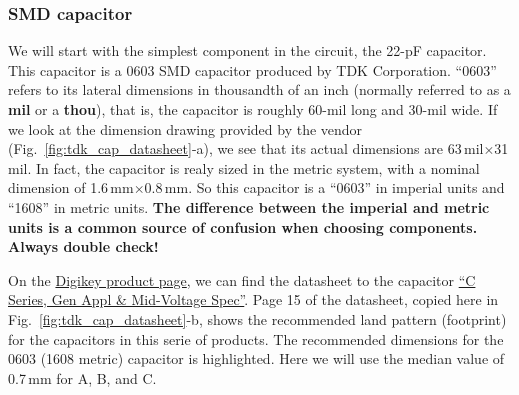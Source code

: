 \documentclass[12pt,letterpaper]{scrartcl}
\begin{document}
\subsubsection{SMD capacitor}
\label{sec:smd_cap_footprint}

We will start with the simplest component in the circuit, the 22-pF capacitor. This capacitor is a 0603 SMD capacitor produced by TDK Corporation. ``0603'' refers to its lateral dimensions in thousandth of an inch (normally referred to as a \textbf{mil} or a \textbf{thou}), that is, the capacitor is roughly 60-mil long and 30-mil wide. If we look at the dimension drawing provided by the vendor (Fig.~\ref{fig:tdk_cap_datasheet}-a), we see that its actual dimensions are 63\,mil$\times$31\,mil. In fact, the capacitor is realy sized in the metric system, with a nominal dimension of 1.6\,mm$\times$0.8\,mm. So this capacitor is a ``0603'' in imperial units and ``1608'' in metric units. \textbf{The difference between the imperial and metric units is a common source of confusion when choosing components. Always double check!}

On the \href{http://www.digikey.com/product-detail/en/C1608C0G1H220J080AA/445-1273-1-ND/567670}{Digikey product page}, we can find the datasheet to the capacitor \href{http://product.tdk.com/en/catalog/spec/mlccspec_commercial_general_midvoltage_en.pdf}{``C Series, Gen Appl \& Mid-Voltage Spec''}. Page 15 of the datasheet, copied here in Fig.~\ref{fig:tdk_cap_datasheet}-b, shows the recommended land pattern (footprint) for the capacitors in this serie of products. The recommended dimensions for the 0603 (1608 metric) capacitor is highlighted. Here we will use the median value of 0.7\,mm for A, B, and C. 
\end{document}
